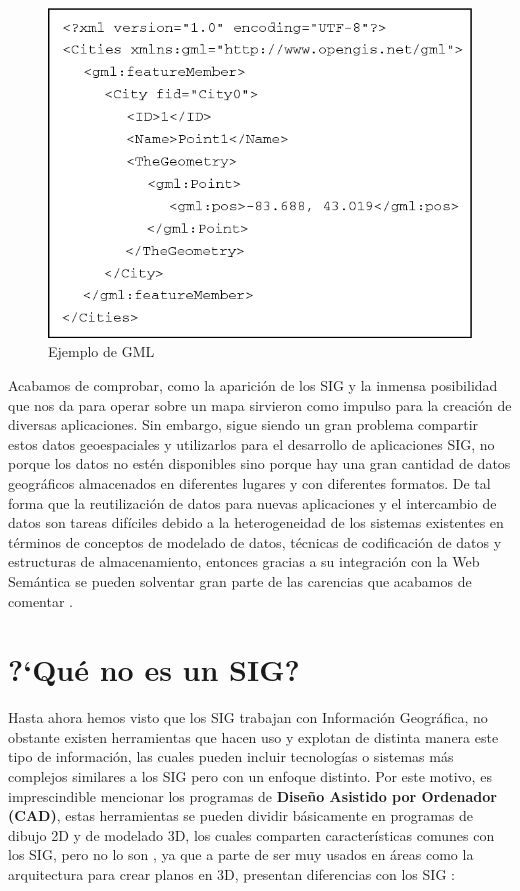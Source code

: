 \begin{figure}[H]
	\centering
	\includegraphics[width=0.62\linewidth]{imagenes/capitulo2/A-GML-representation-of-a-point-feature}
	\caption{Ejemplo de GML \cite{gml}}
	\label{fig:a-gml-representation-of-a-point-feature}
\end{figure}


Acabamos de comprobar, como la aparición de los SIG y la inmensa posibilidad que nos da para operar sobre un mapa sirvieron como impulso para la creación de diversas aplicaciones. Sin embargo, sigue siendo un gran problema compartir estos datos geoespaciales y utilizarlos para el desarrollo de aplicaciones SIG, no porque los datos no estén disponibles sino porque hay una gran cantidad de datos geográficos almacenados en diferentes lugares y con diferentes formatos. De tal forma que la reutilización de datos para nuevas aplicaciones y el intercambio de datos son tareas difíciles debido a la heterogeneidad de los sistemas existentes en términos de conceptos de modelado de datos, técnicas de codificación de datos y estructuras de almacenamiento, entonces gracias a su integración con la Web Semántica se pueden solventar gran parte de las carencias que acabamos de comentar \cite{tesis}.

\section{?`Qué no es un SIG?}

Hasta ahora hemos visto que los SIG trabajan con Información Geográfica, no obstante existen herramientas que hacen uso y explotan de distinta manera este tipo de información, las cuales pueden incluir tecnologías o sistemas más complejos similares a los SIG pero con un enfoque distinto. Por este motivo, es imprescindible mencionar los programas de \textbf{Diseño Asistido por Ordenador (CAD)}, estas herramientas se pueden dividir básicamente en programas de dibujo 2D y de modelado 3D, los cuales comparten características comunes con los SIG, pero no lo son \cite{VictorOlaya}, ya que a parte de ser muy usados en áreas como la arquitectura para crear planos en 3D, presentan diferencias con los SIG \cite{sig-cad}:

